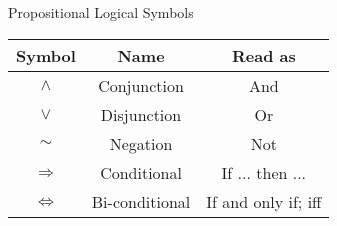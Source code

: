 \begin{defn}\label{mod1:defn:LogicSymbols}
   Propositional Logical Symbols
      
   \begin{table}[ht]
      \centering
      \begin{tabular}{|c|c|c|}
         \hline
            Symbol & Name & Read as\\
         \hline
         $\boldsymbol{\land}$ & Conjunction & And \\
         $\boldsymbol{\lor}$ &   Disjunction & Or \\
         $\boldsymbol{\sim}$ & Negation & Not\\
         $\boldsymbol{\Rightarrow}$ & Conditional & If ... then ...\\
         $\boldsymbol{\Leftrightarrow}$ & Bi-conditional & If and only if; iff\\
         \hline
      \end{tabular}
      \label{mod1:tab:LogicSymbols}
   \end{table}

\end{defn}      

